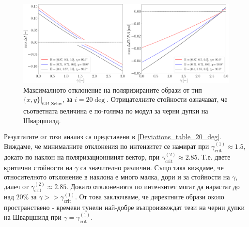\begin{figure}[!htb]
		\hspace{-0.5cm}
		\includegraphics[scale = 0.22]{WH_20_deg_param_sweep.png}
		\caption[Максималното отклонение на поляризираните образи от тип $\{x,y\}\vert_{6M, \text{Schw}}$, за $i = 20\deg$]{Максималното отклонение на поляризираните образи от тип $\{x,y\}\vert_{6M, \text{Schw}}$, за $i = 20\deg$. Отрицателните стойности означават, че съответната величина е по-голяма по модул за черни дупки на Шварцшилд.} 
		\label{WH_max_deviation_20_deg}
\end{figure}
 Резултатите от този анализ са представени в \ref{Deviations_table_20_deg}. Виждаме, че минималните отклонения по интензитет се намират при $\gamma_\text{crit}^{(1)}\approx 1.5$, докато по наклон на поляризационнинят вектор, при $\gamma_\text{crit}^{(2)}\approx 2.85$. Т.е. двете критични стойности на $\gamma$ са значително различни. Също така виждаме, че относителното отклонение в наклона е много малка, дори и за стойности на $\gamma$, далеч от $\gamma_\text{crit}^{(2)}\approx 2.85$. Докато отклоненията по интензитет могат да нарастат до над $20\%$ за $\gamma >> \gamma_\text{crit}^{(1)}$. От това заключваме, че директните образи около пространствено - времеви тунели най-добре възпроизвеждат тези на черни дупки на Шварцшилд при $\gamma = \gamma_\text{crit}^{(1)}$.
